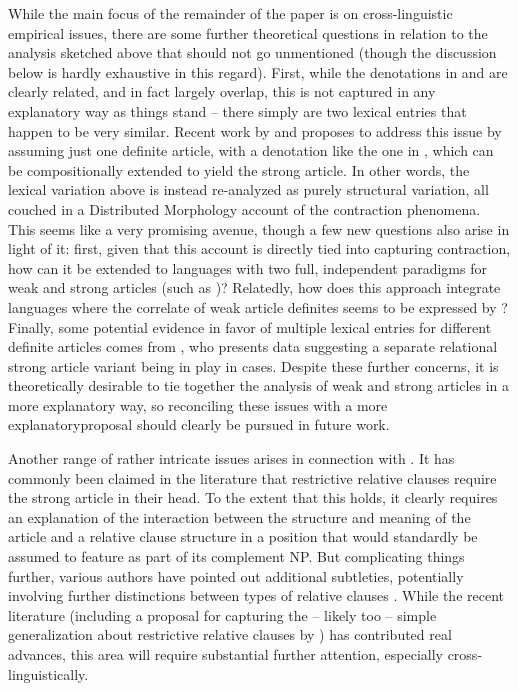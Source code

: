 \documentclass[output=paper
,modfonts
,nonflat]{langscibook}
\begin{document}
While the main focus of the remainder of the paper is on
cross-linguistic empirical issues, there are some further theoretical
questions in relation to the analysis sketched above that should not go
unmentioned (though the discussion below is hardly exhaustive in this
regard). First, while the denotations in  and
 are clearly related, and in fact largely overlap,
this is not captured in any explanatory way as things stand -- there
simply are two lexical entries that happen to be very
similar. Recent work by \citet{Hanink2016} and \citet{Hanink2015}
proposes to address this issue by assuming just one definite article,
with a denotation like the one in , which can be
compositionally extended to yield the strong article. In other words,
the lexical variation above is instead re-analyzed as purely
structural variation, all couched in a Distributed Morphology account
of the contraction phenomena. This seems like a very promising avenue,
though a few new questions also arise in light of it: first, given
that this account is directly tied into capturing contraction, how can
it be extended to languages with two full, independent paradigms for
weak and strong articles (such as )? Relatedly, how does this
approach integrate languages where the correlate of weak article 
definites seems to be expressed by ? Finally, some potential
evidence in favor of multiple lexical entries for different definite
articles comes from \citet{Grubic2016}, who presents data suggesting a
separate relational strong article variant being in play in 
cases. Despite these further concerns, it is theoretically desirable to tie
together the analysis of weak and strong articles in a more
explanatory way, so reconciling these issues with a more explanatory\largerpage[1]
proposal should clearly be pursued in future work.

Another range of rather intricate issues arises in connection with
. It has commonly been claimed in the literature that restrictive relative clauses require the strong article in their
head. To the extent that this holds, it clearly requires an
explanation of the interaction between the structure and meaning of
the article and a relative clause structure in a position that would
standardly be assumed to feature as part of its complement NP. But
complicating things further, various authors have pointed out
additional subtleties, potentially involving further distinctions
between types of relative clauses \citep[see,
among others,][]{Hofherr2013,Wiltschko2013,Simonenko2014}. While the recent
literature (including a proposal for capturing the -- likely too --
simple generalization about restrictive relative clauses by
\citealt{Hanink2016}) has contributed real advances, this
area will require substantial further attention, especially cross-linguistically.
\end{document}
